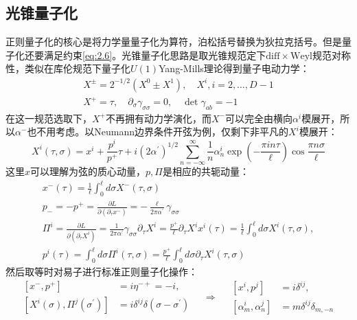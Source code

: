 \subsection{光锥量子化}
正则量子化的核心是将力学量量子化为算符，泊松括号替换为狄拉克括号。但是量子化还要满足约束\ref{eq:2.6}。光锥量子化思路是取光锥规范定下$\mathrm{diff}\times\mathrm{Weyl}$规范对称性，类似在库伦规范下量子化$U(1)$Yang-Mills理论得到量子电动力学：
\begin{equation}
	\begin{gathered}
		X^\pm=2^{-1/2}(X^0\pm X^1),\quad X^i,i=2,\ldots,D-1\\
		X^+=\tau,\quad\partial_\sigma\gamma_{\sigma\sigma}=0,\quad\det\gamma_{ab}=-1
	\end{gathered}
\end{equation}
在这一规范选取下，$X^{+}$不再拥有动力学演化，而$X^{-}$可以完全由横向$\alpha^i$模展开，所以$\alpha^-$也不用考虑。以Neumann边界条件开弦为例，仅剩下非平凡的$X^i$模展开：
\begin{equation}
	\label{eq:2.12}
	X^i(\tau,\sigma)=x^i+\frac{p^i}{p^+}\tau+i(2\alpha^{\prime})^{1/2}\sum_{n=-\infty}^\infty\frac{1}{n}\alpha_n^i\exp\left(-\frac{\pi in\tau}{\ell}\right)\cos\frac{\pi n\sigma}{\ell}
\end{equation}
这里$x$可以理解为弦的质心动量，$p,\Pi$是相应的共轭动量：
\begin{equation}
	\begin{gathered}
		x^-(\tau)=\frac{1}{\ell}\int_0^\ell d\sigma X^-(\tau,\sigma)\\
		p_-=-p^+=\frac{\partial L}{\partial(\partial_\tau x^-)}=-\frac{\ell}{2\pi\alpha^{\prime}}\gamma_{\sigma\sigma}\\
		\Pi^i=\frac{\partial L}{\partial(\partial_\tau X^i)}=\frac{1}{2\pi\alpha^{\prime}}\gamma_{\sigma\sigma}\partial_\tau X^i=\frac{p^+}{\ell}\partial_\tau X^i
		x^i(\tau)=\frac{1}{\ell}\int_0^\ell d\sigma X^i(\tau,\sigma),\\p^i(\tau)=\int_0^\ell d\sigma\Pi^i(\tau,\sigma)=\frac{p^+}{\ell}\int_0^\ell d\sigma\partial_\tau X^i(\tau,\sigma)
	\end{gathered}
\end{equation}
然后取等时对易子进行标准正则量子化操作：
\begin{equation}
	\begin{aligned}
		[x^-,p^+]&=i\eta^{-+}=-i ,\\
		[X^i(\sigma),\Pi^j(\sigma^{\prime})]&=i\delta^{ij}\delta(\sigma-\sigma^{\prime}) 
	\end{aligned}
	\quad\Rightarrow\quad
	\begin{aligned}
		[x^i,p^j]&=i\delta^{ij} ,\\
		[\alpha_m^i,\alpha_n^j]&=m\delta^{ij}\delta_{m,-n}
	\end{aligned}
\end{equation}
